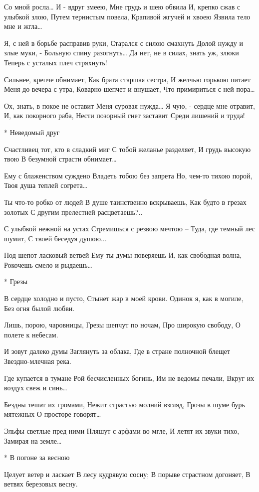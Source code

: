 Со мной росла… И - вдруг змеею,
Мне грудь и шею обвила
И, крепко сжав с улыбкой злою,
Путем тернистым повела,
Крапивой жгучей и хвоею
Язвила тело мне и жгла…

Я, с ней в борьбе расправив руки,
Старался с силою смахнуть
Долой нужду и злые муки, -
Больную спину разогнуть…
Да нет, не в силах, знать уж, злюки
Теперь с усталых плеч стряхнуть!

Сильнее, крепче обнимает,
Как брата старшая сестра,
И желчью горькою питает
Меня до вечера с утра,
Коварно шепчет и внушает,
Что примириться с ней пора…

Ох, знать, в покое не оставит
Меня суровая нужда…
Я чую, - сердце мне отравит,
И, как покорного раба,
Нести позорный гнет заставит
Среди лишений и труда!


* Неведомый друг

Счастливец тот, кто в сладкий миг
С тобой желанье разделяет,
И грудь высокую твою
В безумной страсти обнимает…

Ему с блаженством суждено
Владеть тобою без запрета
Но, чем-то тихою порой,
Твоя душа теплей согрета…

Ты что-то робко от людей
В душе таинственно вскрываешь,
Как будто в грезах золотых
С другим прелестней расцветаешь?..

С улыбкой нежной на устах
Стремишься с резвою мечтою –
Туда, где темный лес шумит,
С твоей беседуя душою...

Под шепот ласковый ветвей
Ему ты думы поверяешь
И, как свободная волна,
Рокочешь смело и рыдаешь…


* Грезы

В сердце холодно и пусто,
Стынет жар в моей крови.
Одинок я, как в могиле,
Без огня былой любви.

Лишь, порою, чаровницы,
Грезы шепчут по ночам,
Про широкую свободу,
О полете к небесам.

И зовут далеко думы
Заглянуть за облака,
Где в стране полночной блещет
Звездно-млечная река.

Где купается в тумане
Рой бесчисленных богинь,
Им не ведомы печали,
Вкруг их воздух свеж и синь…

Бездны тешат их громами,
Нежит страстью молний взгляд,
Грозы в шуме бурь мятежных
О просторе говорят…

Эльфы светлые пред ними
Пляшут с арфами во мгле,
И летят их звуки тихо,
Замирая на земле…


* В погоне за весною

Целует ветер и ласкает
В лесу кудрявую сосну;
В порыве страстном догоняет,
В ветвях березовых весну.

